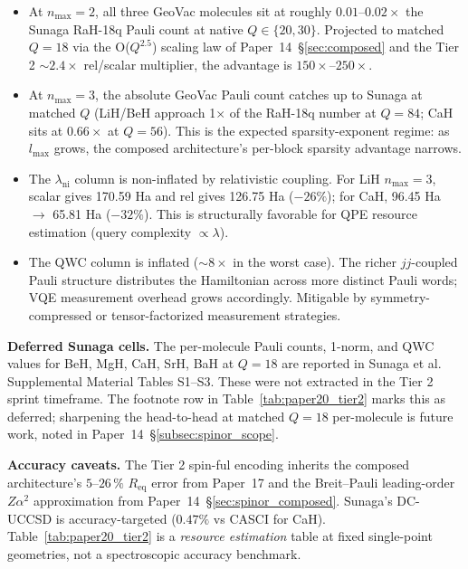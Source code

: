 \documentclass[twocolumn,pra,amsmath,amssymb,superscriptaddress]{revtex4-2}
\begin{document}
\begin{itemize}
  \item At $n_{\max}=2$, all three GeoVac molecules sit at roughly
    $0.01$--$0.02\times$ the Sunaga RaH-18q Pauli count at native
    $Q \in \{20, 30\}$. Projected to matched $Q = 18$ via the
    O($Q^{2.5}$) scaling law of Paper~14~\S\ref{sec:composed} and the
    Tier 2 $\sim 2.4\times$ rel/scalar multiplier, the advantage is
    $150\times$--$250\times$.
  \item At $n_{\max}=3$, the absolute GeoVac Pauli count catches up to
    Sunaga at matched $Q$ (LiH/BeH approach 1$\times$ of the RaH-18q
    number at $Q = 84$; CaH sits at $0.66\times$ at $Q = 56$). This
    is the expected sparsity-exponent regime: as $l_{\max}$ grows,
    the composed architecture's per-block sparsity advantage narrows.
  \item The $\lambda_{\mathrm{ni}}$ column is non-inflated by
    relativistic coupling. For LiH $n_{\max}=3$, scalar gives
    170.59 Ha and rel gives 126.75 Ha ($-26\%$); for CaH,
    96.45 Ha $\to$ 65.81 Ha ($-32\%$). This is structurally favorable
    for QPE resource estimation (query complexity $\propto \lambda$).
  \item The QWC column is inflated ($\sim 8\times$ in the worst case).
    The richer $jj$-coupled Pauli structure distributes the
    Hamiltonian across more distinct Pauli words; VQE measurement
    overhead grows accordingly. Mitigable by symmetry-compressed
    or tensor-factorized measurement strategies.
\end{itemize}

\textbf{Deferred Sunaga cells.} The per-molecule Pauli counts, 1-norm,
and QWC values for BeH, MgH, CaH, SrH, BaH at $Q = 18$ are reported
in Sunaga et al.~\cite{Sunaga2025} Supplemental Material Tables
S1--S3. These were not extracted in the Tier 2 sprint timeframe. The
footnote row in Table~\ref{tab:paper20_tier2} marks this as deferred;
sharpening the head-to-head at matched $Q = 18$ per-molecule is
future work, noted in Paper~14~\S\ref{subsec:spinor_scope}.

\textbf{Accuracy caveats.} The Tier 2 spin-ful encoding inherits the
composed architecture's $5$--$26\,\%$ $R_{\mathrm{eq}}$ error from
Paper~17 and the Breit--Pauli leading-order $Z\alpha^2$ approximation
from Paper~14~\S\ref{sec:spinor_composed}. Sunaga's DC-UCCSD is
accuracy-targeted ($0.47\%$ vs CASCI for CaH). Table~\ref{tab:paper20_tier2}
is a \emph{resource estimation} table at fixed single-point
geometries, not a spectroscopic accuracy benchmark.
\end{document}
